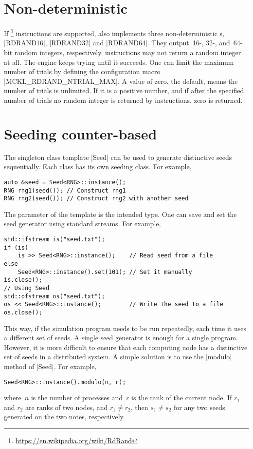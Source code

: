 \section{Non-deterministic \texorpdfstring{\rng}{RNG}}
\label{sec:Non-deterministic RNG}

If \rdrand\footnote{\url{https://en.wikipedia.org/wiki/RdRand}} instructions
are supported, \mckl also implements three non-deterministic \rng{}s,
|RDRAND16|, |RDRAND32| and |RDRAND64|. They output~16-, 32-, and~64-bit random
integers, respectively. \rdrand instructions may not return a random integer at
all. The \rng engine keeps trying until it succeeds. One can limit the maximum
number of trials by defining the configuration macro |MCKL_RDRAND_NTRIAL_MAX|.
A value of zero, the default, means the number of trials is unlimited. If it is
a positive number, and if after the specified number of trials no random
integer is returned by \rdrand instructions, zero is returned.

\section{Seeding counter-based \texorpdfstring{\rng}{RNG}}
\label{sec:Seeding counter-based RNG}

The singleton class template |Seed| can be used to generate distinctive seeds
sequentially. Each \rng class has its own seeding class. For example,
\begin{verbatim}
auto &seed = Seed<RNG>::instance();
RNG rng1(seed()); // Construct rng1
RNG rng2(seed()); // Construct rng2 with another seed
\end{verbatim}
The parameter of the template is the intended \rng type. One can save and set
the seed generator using standard streams. For example,
\begin{verbatim}
std::ifstream is("seed.txt");
if (is)
    is >> Seed<RNG>::instance();    // Read seed from a file
else
    Seed<RNG>::instance().set(101); // Set it manually
is.close();
// Using Seed
std::ofstream os("seed.txt");
os << Seed<RNG>::instance();        // Write the seed to a file
os.close();
\end{verbatim}
This way, if the simulation program needs to be run repeatedly, each time it
uses a different set of seeds. A single seed generator is enough for a single
program. However, it is more difficult to ensure that each computing node has a
distinctive set of seeds in a distributed system. A simple solution is to use
the |modulo| method of |Seed|. For example,
\begin{verbatim}
Seed<RNG>::instance().modulo(n, r);
\end{verbatim}
where~$n$ is the number of processes and~$r$ is the rank of the current node.
If $r_1$ and $r_2$ are ranks of two nodes, and $r_1 \ne r_2$, then $s_1 \ne
s_2$ for any two seeds generated on the two notes, respectively.

